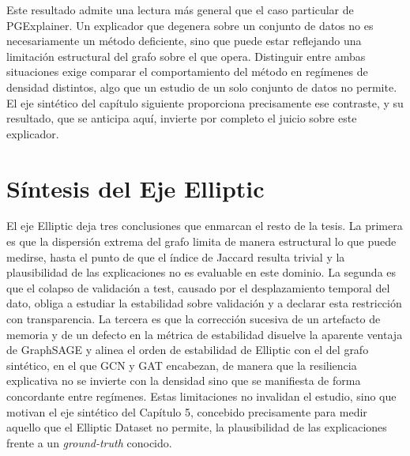 Este resultado admite una lectura más general que el caso particular de PGExplainer. Un explicador que degenera sobre un conjunto de datos no es necesariamente un método deficiente, sino que puede estar reflejando una limitación estructural del grafo sobre el que opera. Distinguir entre ambas situaciones exige comparar el comportamiento del método en regímenes de densidad distintos, algo que un estudio de un solo conjunto de datos no permite. El eje sintético del capítulo siguiente proporciona precisamente ese contraste, y su resultado, que se anticipa aquí, invierte por completo el juicio sobre este explicador.

\section{Síntesis del Eje Elliptic}

El eje Elliptic deja tres conclusiones que enmarcan el resto de la tesis. La primera es que la dispersión extrema del grafo limita de manera estructural lo que puede medirse, hasta el punto de que el índice de Jaccard resulta trivial y la plausibilidad de las explicaciones no es evaluable en este dominio. La segunda es que el colapso de validación a test, causado por el desplazamiento temporal del dato, obliga a estudiar la estabilidad sobre validación y a declarar esta restricción con transparencia. La tercera es que la corrección sucesiva de un artefacto de memoria y de un defecto en la métrica de estabilidad disuelve la aparente ventaja de GraphSAGE y alinea el orden de estabilidad de Elliptic con el del grafo sintético, en el que GCN y GAT encabezan, de manera que la resiliencia explicativa no se invierte con la densidad sino que se manifiesta de forma concordante entre regímenes. Estas limitaciones no invalidan el estudio, sino que motivan el eje sintético del Capítulo 5, concebido precisamente para medir aquello que el Elliptic Dataset no permite, la plausibilidad de las explicaciones frente a un \textit{ground-truth} conocido.
